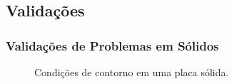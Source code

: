 \documentclass{beamer}
\begin{document}
\subsection{Validações}
\begin{frame}
  \frametitle{Validações de Problemas em Sólidos}
  
  \begin{minipage}{.48\textwidth}
    \centering
    \begin{figure}
       {\raggedleft \tiny Condições de contorno em uma placa sólida.}
    \end{figure}
  \end{minipage}
  \hfill
  \begin{minipage}{.48\textwidth}
    \begin{figure}
\end{figure}
\end{minipage}
\end{frame}
\end{document}
